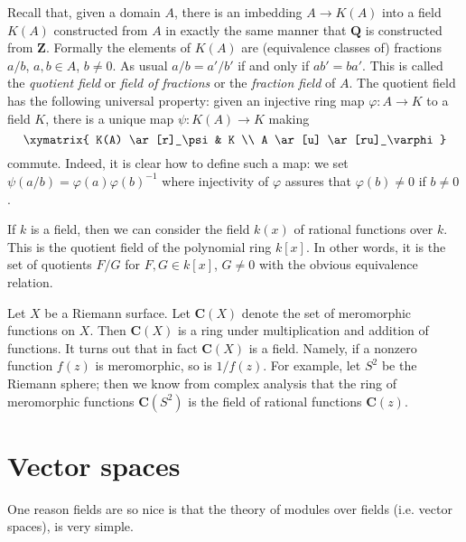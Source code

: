 \begin{example}
\label{example-quotient-field}
Recall that, given a domain $A$, there is an imbedding $A \to K(A)$ into a
field $K(A)$ constructed from $A$ in exactly the same manner that
$\mathbf{Q}$ is constructed from $\mathbf{Z}$. Formally the elements
of $K(A)$ are (equivalence classes of) fractions $a/b$,
$a, b \in A$, $b \not = 0$. As usual $a/b = a'/b'$ if and only if $ab' = ba'$.
This is called the {\it quotient field} or {\it field of fractions} or
the {\it fraction field} of $A$.
The quotient field has the following universal property: given an
injective ring map $\varphi : A \to K$ to a field $K$, there is a unique
map $\psi : K(A) \to K$ making
$$
\xymatrix{
K(A) \ar[r]_\psi & K \\
A \ar[u] \ar[ru]_\varphi
}
$$
commute. Indeed, it is clear how to define such a map: we set
$\psi(a/b) = \varphi(a)\varphi(b)^{-1}$ where injectivity of $\varphi$
assures that $\varphi(b) \not = 0$ if $ b \not = 0$.
\end{example}

\begin{example}
\label{example-field-of-rational-functions}
If $k$ is a field, then we can consider the field $k(x)$ of rational
functions over $k$. This is the quotient field of the polynomial ring
$k[x]$. In other words, it is the set of quotients $F/G$ for
$F, G \in k[x]$, $G \not = 0$ with the obvious equivalence relation.
\end{example}

\begin{example}
\label{example-field-of-meromorphic-functions}
Let $X$ be a Riemann surface. Let $\mathbf{C}(X)$ denote the
set of meromorphic functions on $X$. Then $\mathbf{C}(X)$ is a ring under
multiplication and addition of functions. It turns out that in fact
$\mathbf{C}(X)$ is a field. Namely, if a nonzero function $f(z)$ is
meromorphic, so is $1/f(z)$. For example, let $S^2$ be the Riemann
sphere; then we know from complex analysis that the ring of meromorphic
functions $\mathbf{C}(S^2)$ is the field of rational functions $\mathbf{C}(z)$.
\end{example}



\section{Vector spaces}
\label{section-vector-spaces}

\noindent
One reason fields are so nice is that the theory of modules over fields
(i.e. vector spaces), is very simple.

